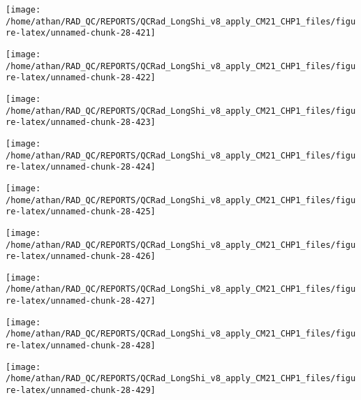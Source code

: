 \documentclass[
  10pt,
  a4paper,oneside]{article}
\begin{document}
\begin{center}\texttt{[image: /home/athan/RAD\_QC/REPORTS/QCRad\_LongShi\_v8\_apply\_CM21\_CHP1\_files/figure-latex/unnamed-chunk-28-421]} \end{center}

\begin{center}\texttt{[image: /home/athan/RAD\_QC/REPORTS/QCRad\_LongShi\_v8\_apply\_CM21\_CHP1\_files/figure-latex/unnamed-chunk-28-422]} \end{center}

\begin{center}\texttt{[image: /home/athan/RAD\_QC/REPORTS/QCRad\_LongShi\_v8\_apply\_CM21\_CHP1\_files/figure-latex/unnamed-chunk-28-423]} \end{center}

\begin{center}\texttt{[image: /home/athan/RAD\_QC/REPORTS/QCRad\_LongShi\_v8\_apply\_CM21\_CHP1\_files/figure-latex/unnamed-chunk-28-424]} \end{center}

\begin{center}\texttt{[image: /home/athan/RAD\_QC/REPORTS/QCRad\_LongShi\_v8\_apply\_CM21\_CHP1\_files/figure-latex/unnamed-chunk-28-425]} \end{center}

\begin{center}\texttt{[image: /home/athan/RAD\_QC/REPORTS/QCRad\_LongShi\_v8\_apply\_CM21\_CHP1\_files/figure-latex/unnamed-chunk-28-426]} \end{center}

\begin{center}\texttt{[image: /home/athan/RAD\_QC/REPORTS/QCRad\_LongShi\_v8\_apply\_CM21\_CHP1\_files/figure-latex/unnamed-chunk-28-427]} \end{center}

\begin{center}\texttt{[image: /home/athan/RAD\_QC/REPORTS/QCRad\_LongShi\_v8\_apply\_CM21\_CHP1\_files/figure-latex/unnamed-chunk-28-428]} \end{center}

\begin{center}\texttt{[image: /home/athan/RAD\_QC/REPORTS/QCRad\_LongShi\_v8\_apply\_CM21\_CHP1\_files/figure-latex/unnamed-chunk-28-429]} \end{center}
\end{document}
